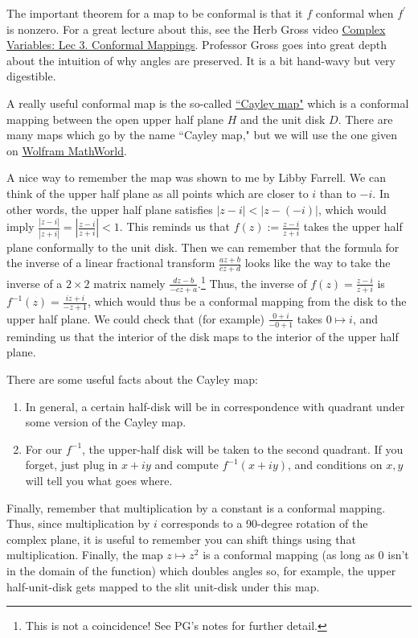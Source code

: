 \documentclass[10pt]{article}
\begin{document}
The important theorem for a map to be conformal is that it $f$ conformal when $f^\prime$ is nonzero. For a great lecture about this, see the Herb Gross video \href{https://www.youtube.com/watch?v=s1DFa1dCss0}{Complex Variables: Lec 3. Conformal Mappings}. Professor Gross goes into great depth about the intuition of why angles are preserved. It is a bit hand-wavy but very digestible. 

A really useful conformal map is the so-called \href{http://www-users.math.umn.edu/~garrett/m/complex/notes_2014-15/07_conformal_mapping.pdf}{``Cayley map"} which is a conformal mapping between the open upper half plane $H$ and the unit disk $D$. There are many maps which go by the name ``Cayley map," but we will use the one given on \href{https://mathworld.wolfram.com/CayleyTransform.html}{Wolfram MathWorld}.

A nice way to remember the map was shown to me by Libby Farrell. 
We can think of the upper half plane as all points which are closer to $i$ than to $-i$. 
In other words, the upper half plane satisfies $| z - i | < |z- (-i)|$, which would imply $\frac{|z-i|}{|z+i|}  = \left | \frac{z-i}{z+i} \right |< 1$. 
This reminds us that $f(z) := \frac{z-i}{z+i}$ takes the upper half plane conformally to the unit disk. 
Then we can remember that the formula for the inverse of a linear fractional transform $\frac{az + b}{cz+d}$ looks like the way to take the inverse of a $2\times 2$ matrix namely $\frac{dz - b}{-cz + a}$.\footnote{This is not a coincidence! See PG's notes for further detail.} 
Thus, the inverse of $f(z) = \frac{z-i}{z+i}$ is $f^{-1}(z) = \frac{iz + i}{-z+1}$, which would thus be a conformal mapping from the disk to the upper half plane. We could check that (for example) $\frac{0+i}{-0+1}$ takes $0 \mapsto i$, and reminding us that the interior of the disk maps to the interior of the upper half plane.

There are some useful facts about the Cayley map:
\begin{enumerate}
	\item In general, a certain half-disk will be in correspondence with quadrant under some version of the Cayley map.
	\item For our $f^{-1}$, the upper-half disk will be taken to the second quadrant. If you forget, just plug in $x+iy$ and compute $f^{-1}(x+iy)$, and conditions on $x,y$ will tell you what goes where.
\end{enumerate}

Finally, remember that multiplication by a constant is a conformal mapping. Thus, since multiplication by $i$ corresponds to a 90-degree rotation of the complex plane, it is useful to remember you can shift things using that multiplication. Finally, the map $z \mapsto z^2$ is a conformal mapping (as long as $0$ isn't in the domain of the function) which doubles angles so, for example, the upper half-unit-disk gets mapped to the slit unit-disk under this map.
\end{document}
